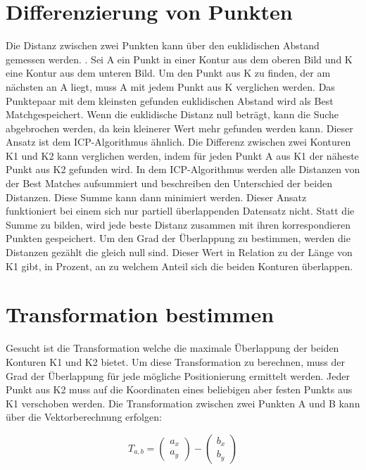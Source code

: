 \section{Differenzierung von Punkten}

Die Distanz zwischen zwei Punkten kann über den euklidischen Abstand gemessen werden.
\cite{Dokmanic.2015}. Sei A ein Punkt in einer Kontur aus dem oberen Bild und K eine 
Kontur aus dem unteren Bild.  
Um den Punkt aus K zu finden, der am nächsten an A liegt, muss A mit jedem Punkt aus 
K verglichen werden. Das Punktepaar mit dem kleinsten gefunden euklidischen Abstand 
wird als \glq Best Match\grq gespeichert. Wenn die euklidische Distanz null beträgt, kann 
die Suche abgebrochen werden, da kein kleinerer Wert mehr gefunden werden kann.
Dieser Ansatz ist dem ICP-Algorithmus ähnlich. Die Differenz zwischen zwei Konturen 
K1 und K2 kann verglichen werden, indem für jeden Punkt A aus K1 der näheste Punkt aus 
K2 gefunden wird. In dem ICP-Algorithmus werden alle Distanzen von der \glq Best Matches \grq 
aufsummiert und beschreiben den Unterschied der beiden Distanzen. Diese Summe kann dann 
minimiert werden. Dieser Ansatz funktioniert bei einem sich nur partiell
überlappenden Datensatz nicht. 
Statt die Summe zu bilden, wird jede beste Distanz zusammen mit ihren korrespondieren 
Punkten gespeichert. Um den Grad der Überlappung zu bestimmen, werden die Distanzen 
gezählt die gleich null sind. Dieser Wert in Relation zu der Länge von K1 gibt, 
in Prozent, an zu welchem Anteil sich die beiden Konturen überlappen.

\section{Transformation bestimmen}

Gesucht ist die Transformation welche die maximale Überlappung der beiden 
Konturen K1 und K2 bietet. Um diese Transformation zu berechnen, muss der 
Grad der Überlappung für jede mögliche Positionierung ermittelt werden. Jeder
Punkt aus K2 muss auf die Koordinaten eines beliebigen aber festen Punkts aus K1 
verschoben werden.
Die Transformation zwischen zwei Punkten A und B kann über die Vektorberechnung erfolgen:

\begin{equation*}
    T_{a,b} = \begin{pmatrix}a_x\\a_y\end{pmatrix} - \begin{pmatrix}b_x\\b_y\end{pmatrix}
\end{equation*}

